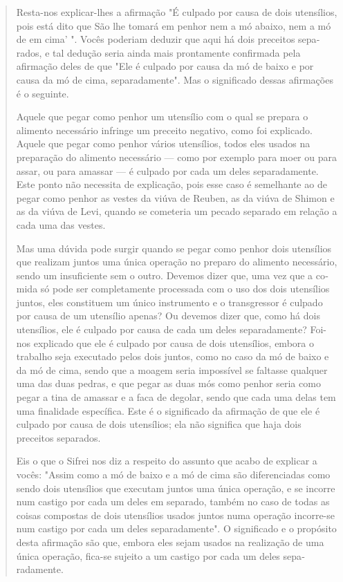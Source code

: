 \begin{quote}
Resta-nos explicar-lhes a afirmação "É culpado por causa de dois
uten­sílios, pois está dito que São lhe tomará em penhor nem a mó
abaixo, nem a mó de em cima' ". Vocês poderiam deduzir que aqui há dois
preceitos sepa­rados, e tal dedução seria ainda mais prontamente
confirmada pela afirmação deles de que "Ele é culpado por causa da mó de
baixo e por causa da mó de cima, separadamente". Mas o significado
dessas afirmações é o seguinte.

Aquele que pegar como penhor um utensílio com o qual se prepara o
alimento necessário infringe um preceito negativo, como foi explicado.
Aque­le que pegar como penhor vários utensílios, todos eles usados na
preparação do alimento necessário --- como por exemplo para moer ou para
assar, ou para amassar --- é culpado por cada um deles separadamente.
Este ponto não necessita de explicação, pois esse caso é semelhante ao
de pegar como pe­nhor as vestes da viúva de Reuben, as da viúva de
Shimon e as da viúva de Levi, quando se cometeria um pecado separado em
relação a cada uma das vestes.

Mas uma dúvida pode surgir quando se pegar como penhor dois uten­sílios
que realizam juntos uma única operação no preparo do alimento
necessá­rio, sendo um insuficiente sem o outro. Devemos dizer que, uma
vez que a co­mida só pode ser completamente processada com o uso dos
dois utensílios jun­tos, eles constituem um único instrumento e o
transgressor é culpado por cau­sa de um utensílio apenas? Ou devemos
dizer que, como há dois utensílios, ele é culpado por causa de cada um
deles separadamente? Foi-nos explicado que ele é culpado por causa de
dois utensílios, embora o trabalho seja executado pelos dois juntos,
como no caso da mó de baixo e da mó de cima, sendo que a moagem seria
impossível se faltasse qualquer uma das duas pedras, e que pe­gar as
duas mós como penhor seria como pegar a tina de amassar e a faca de
degolar, sendo que cada uma delas tem uma finalidade específica. Este é
o sig­nificado da afirmação de que ele é culpado por causa de dois
utensílios; ela não significa que haja dois preceitos separados.

Eis o que o Sifrei nos diz a respeito do assunto que acabo de expli­car
a vocês: "Assim como a mó de baixo e a mó de cima são diferenciadas como
sendo dois utensílios que executam juntos uma única operação, e se
incorre num castigo por cada um deles em separado, também no caso de
to­das as coisas compostas de dois utensílios usados juntos numa
operação incorre-se num castigo por cada um deles separadamente". O
significado e o pro­pósito desta afirmação são que, embora eles sejam
usados na realização de uma única operação, fica-se sujeito a um castigo
por cada um deles sepa­radamente.


\end{quote}

